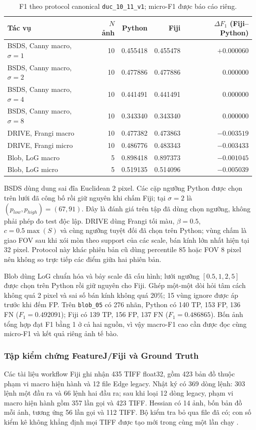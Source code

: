 \begin{table}[htbp]
\centering
\caption{F1 theo protocol canonical \texttt{duc\_10\_11\_v1}; micro-F1 được báo cáo riêng.}
\label{tab:repo-canonical-f1}
\begin{tabular}{lrrrr}
\toprule
Tác vụ & $N$ ảnh & Python & Fiji & $\Delta F_1$ (Fiji--Python)\\
\midrule
BSDS, Canny macro, $\sigma=1$ & 10 & 0.455418 & 0.455478 & $+0.000060$\\
BSDS, Canny macro, $\sigma=2$ & 10 & 0.477886 & 0.477886 & $0.000000$\\
BSDS, Canny macro, $\sigma=4$ & 10 & 0.441491 & 0.441491 & $0.000000$\\
BSDS, Canny macro, $\sigma=8$ & 10 & 0.343340 & 0.343340 & $0.000000$\\
DRIVE, Frangi macro & 10 & 0.477382 & 0.473863 & $-0.003519$\\
DRIVE, Frangi micro & 10 & 0.486776 & 0.483343 & $-0.003433$\\
Blob, LoG macro & 5 & 0.898418 & 0.897373 & $-0.001045$\\
Blob, LoG micro & 5 & 0.519135 & 0.514096 & $-0.005039$\\
\bottomrule
\end{tabular}
\end{table}

BSDS dùng dung sai đĩa Euclidean 2 pixel. Các cặp ngưỡng Python được chọn
trên lưới đã công bố rồi giữ nguyên khi chấm Fiji; tại $\sigma=2$ là
$(p_{low},p_{high})=(67,91)$. Đây là đánh giá trên tập đã dùng chọn ngưỡng,
không phải phép đo test độc lập. DRIVE dùng Frangi tối màu, $\beta=0.5$,
$c=0.5\max(S)$ và cùng ngưỡng tuyệt đối đã chọn trên Python; vùng chấm là
giao FOV sau khi xói mòn theo support của các scale, bán kính lớn nhất hiện
tại 32 pixel. Protocol này khác phiên bản cũ dùng percentile 85 hoặc FOV
8 pixel nên không so trực tiếp các điểm giữa hai phiên bản.

Blob dùng LoG chuẩn hóa và bảy scale đã cấu hình; lưới ngưỡng
$[0.5,1,2,5]$ được chọn trên Python rồi giữ nguyên cho Fiji. Ghép một-một
dòi hỏi tâm cách không quá 2 pixel và sai số bán kính không quá 20\%; 15
vùng ignore được áp trước khi đếm FP. Trên \texttt{blob\_05} có 276 nhãn,
Python có 140 TP, 153 FP, 136 FN ($F_1=0.492091$); Fiji có 139 TP, 156 FP,
137 FN ($F_1=0.486865$). Bốn ảnh tổng hợp đạt F1 bằng 1 ở cả hai nguồn, vì
vậy macro-F1 cao cần được đọc cùng micro-F1 và kết quả riêng ảnh tế bào.

\subsubsection{Tập kiểm chứng FeatureJ/Fiji và Ground Truth}
Các tài liệu workflow Fiji ghi nhận 435 TIFF float32, gồm 423 bản đồ thuộc
phạm vi macro hiện hành và 12 file Edge legacy. Nhật ký có 369 dòng lệnh:
303 lệnh một đầu ra và 66 lệnh hai đầu ra; sau khi loại 12 dòng legacy, phạm
vi macro hiện hành gồm 357 lần gọi và 423 TIFF. Hessian có 14 ảnh, bốn bản
đồ mỗi ảnh, tương ứng 56 lần gọi và 112 TIFF. Bộ kiểm tra bỏ qua file đã có;
con số kiểm kê không khẳng định mọi TIFF được tạo mới trong cùng một lần chạy
\cite{xlaUpdate950,xlaRepository}.


